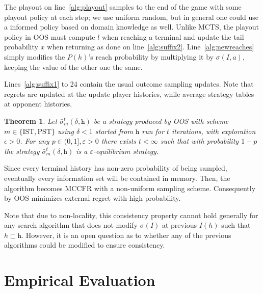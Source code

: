 \documentclass[letterpaper]{article}
\newcommand{\tth}{\mathtt{h}}
\newtheorem{theorem}{Theorem}
\newcounter{mlNoteCounter}
\newcommand{\mlnote}[1]{{\scriptsize \color{darkgreen} $\blacksquare$ \refstepcounter{mlNoteCounter}\textsf{[ML]$_{\arabic{mlNoteCounter}}$:{#1}}}}
\begin{document}
The playout on line~\ref{alg:playout} samples to the end of the game with some playout policy at each step; we use uniform random, 
but in general one could use a informed policy based on domain knowledge as well. 
Unlike MCTS, the playout policy in OOS must compute $l$ when reaching a terminal and update the tail probability $x$ when returning
as done on line~\ref{alg:suffix2}. Line~\ref{alg:newreaches} simply modifies the $P(h)$'s reach probability by multiplying it by $\sigma(I,a)$, keeping the value of the other one the same.

Lines~\ref{alg:suffix1} to 24
contain the usual outcome sampling updates. Note that regrets are updated at the 
update player histories, while average strategy tables at opponent histories. 

\begin{theorem}
Let $\bar{\sigma}^t_m(\delta,\tth)$ be a strategy produced by OOS with scheme $m \in \{ \mbox{IST}, \mbox{PST} \}$ 
using $\delta < 1$ started from $\tth$ run for $t$ iterations, with exploration $\epsilon > 0$.  
For any $p \in (0, 1], \varepsilon > 0$ there exists $t < \infty$ such that with 
probability $1-p$ the strategy  $\bar{\sigma}^t_m(\delta,\tth)$ is a $\varepsilon$-equilibrium strategy. 
\label{thm:consistency}
\end{theorem}
Since every terminal history has non-zero probability of being sampled, eventually every information 
set will be contained in memory. Then, the algorithm becomes MCCFR with a non-uniform sampling scheme.
Consequently by \cite[Theorem 5]{Lanctot09Sampling} OOS minimizes external regret with high probability.

Note that due to non-locality, this consistency property cannot hold generally for any search 
algorithm that does not modify $\sigma(I)$ at previous $I(h)$ such that $h \sqsubset \tth$. However, 
it is an open question as to whether any of the previous algorithms could be modified to ensure 
consistency.

\section{Empirical Evaluation}

\end{document}

